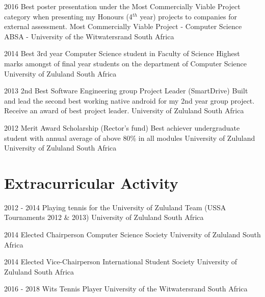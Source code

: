 \documentclass[11pt, letterpaper]{moderncv}        %
\begin{document}
\cventry
{2016}
{Best poster presentation under the Most Commercially Viable Project category when presenting my Honours (4$^{th}$ year) projects to companies for external assessment.}
{Most Commercially Viable Project - Computer Science}
{ABSA - University of the Witwatersrand}
{South Africa}
{}

\cventry
{2014}
{Best 3rd year Computer Science student in Faculty of Science}
{Highest marks amongst of final year students on the department of Computer Science}
{University of Zululand}
{South Africa}
{}


\cventry
{2013}
{2nd Best Software Engineering group Project Leader (SmartDrive)}
{Built and lead the second best working native android for my 2nd year group project. Receive an award of best project leader.}
{University of Zululand}
{South Africa}
{}

\cventry
{2012}
{Merit Award Scholarship (Rector’s fund)}
{Best achiever undergraduate student with annual average of above 80\% in all modules}
{University of Zululand}
{University of Zululand}
{South Africa}
{}

\section{Extracurricular Activity}
\cventry
{2012 - 2014}
{Playing tennis for the University of Zululand Team (USSA Tournaments 2012 \& 2013)}
{University	of Zululand}
{South Africa}
{}
{}

\cventry
{2014}
{Elected Chairperson Computer Science Society}
{University	of Zululand}
{South Africa}
{}
{}

\cventry
{2014}
{Elected Vice-Chairperson International Student Society}
{University	of Zululand}
{South Africa}
{}
{}

\cventry
{2016 - 2018}
{Wits Tennis Player}
{University	of the Witwatersrand}
{South Africa}
{}
{}
\end{document}

